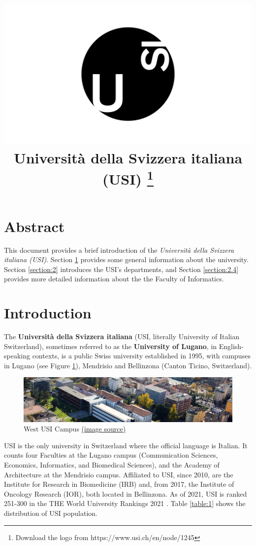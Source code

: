 \documentclass[letterpaper,11pt]{article}
\title{
\includegraphics[width=0.4\linewidth]{usi_logo.png}\\
Universit\`a della Svizzera italiana (USI)
\thanks{Download the logo from https://www.usi.ch/en/node/1245}
}
\author{}
\date{}
\begin{document}
\maketitle

\section*{Abstract}
This document provides a brief introduction of the \textit{Universit\`a della Svizzera italiana (USI)\footnotemark}.
Section \ref{section:1} provides some general information about the university. 
Section \ref{section:2} introduces the USI’s departments, and Section \ref{section:2.4} provides more detailed information about the the Faculty of Informatics.


\tableofcontents
\newpage    

\section{Introduction}
\label{section:1}
The \textbf{Universit\`a della Svizzera italiana} (USI, literally University of Italian Switzerland), sometimes referred to as the \textbf{University of Lugano}, in English-speaking contexts, is a public Swiss university established in 1995, with campuses in Lugano (see Figure \ref{figure:1}), Mendrisio and Bellinzona (Canton Ticino, Switzerland).

\begin{figure}[h]
    \centering
    \includegraphics[width=\linewidth]{usi1.jpg}
    \caption{West USI Campus 
        \href{https://uc.inf.usi.ch/wp-content/uploads/2016/07/banner-arial-1170x250.jpg}{(image source)}}
    \label{figure:1}
\end{figure}


USI is the only university in Switzerland where the official language is Italian. It counts
four Faculties at the Lugano campus (Communication Sciences, Economics, Informatics, and
Biomedical Sciences), and the Academy of Architecture at the Mendrisio campus. Affiliated
to USI, since 2010, are the Institute for Research in Biomedicine (IRB) and, from 2017, the
Institute of Oncology Research (IOR), both located in Bellinzona. As of 2021, USI is ranked
251-300 in the THE World University Rankings 2021 \cite{wur}. Table \ref{table:1} shows the distribution of
USI population.
\end{document}
